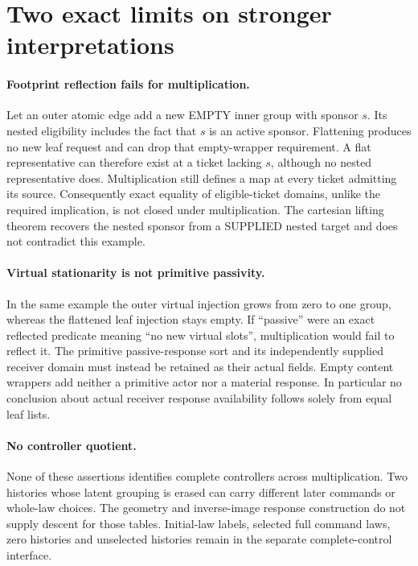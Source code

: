 \documentclass[11pt]{article}
\begin{document}
\section{Two exact limits on stronger interpretations}
\paragraph{Footprint reflection fails for multiplication.}
Let an outer atomic edge add a new EMPTY inner group with sponsor $s$. Its nested eligibility includes the fact that $s$ is an active sponsor. Flattening produces no new leaf request and can drop that empty-wrapper requirement. A flat representative can therefore exist at a ticket lacking $s$, although no nested representative does. Multiplication still defines a map at every ticket admitting its source. Consequently exact equality of eligible-ticket domains, unlike the required implication, is not closed under multiplication. The cartesian lifting theorem recovers the nested sponsor from a SUPPLIED nested target and does not contradict this example.

\paragraph{Virtual stationarity is not primitive passivity.}
In the same example the outer virtual injection grows from zero to one group, whereas the flattened leaf injection stays empty. If ``passive'' were an exact reflected predicate meaning ``no new virtual slots'', multiplication would fail to reflect it. The primitive passive-response sort and its independently supplied receiver domain must instead be retained as their actual fields. Empty content wrappers add neither a primitive actor nor a material response. In particular no conclusion about actual receiver response availability follows solely from equal leaf lists.

\paragraph{No controller quotient.}
None of these assertions identifies complete controllers across multiplication. Two histories whose latent grouping is erased can carry different later commands or whole-law choices. The geometry and inverse-image response construction do not supply descent for those tables. Initial-law labels, selected full command laws, zero histories and unselected histories remain in the separate complete-control interface.
\end{document}
